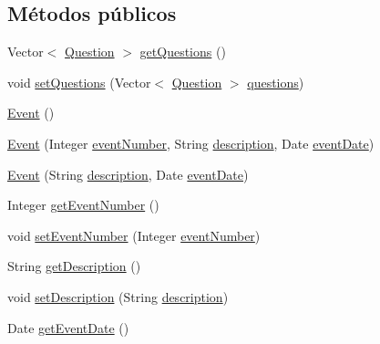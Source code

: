 \subsection*{Métodos públicos}
\begin{DoxyCompactItemize}
\item 
Vector$<$ \mbox{\hyperlink{classdomain_1_1Question}{Question}} $>$ \mbox{\hyperlink{classdomain_1_1Event_a00fc2897c3329b2319545e165e54b8da}{get\+Questions}} ()
\item 
void \mbox{\hyperlink{classdomain_1_1Event_ae1bcc6c5a8da547b4f930132fdfb7a36}{set\+Questions}} (Vector$<$ \mbox{\hyperlink{classdomain_1_1Question}{Question}} $>$ \mbox{\hyperlink{classdomain_1_1Event_ab5621abc5bae7bc3d8ece713fa2e1e38}{questions}})
\item 
\mbox{\hyperlink{classdomain_1_1Event_a1d0bc6f1fb6b0d7f7732ab132c09e868}{Event}} ()
\item 
\mbox{\hyperlink{classdomain_1_1Event_ae54063394d89364db7a777096e64d2e0}{Event}} (Integer \mbox{\hyperlink{classdomain_1_1Event_a7a297461605e871f55e9752c5652a07e}{event\+Number}}, String \mbox{\hyperlink{classdomain_1_1Event_a14d38176e81b4e75c84d4aaea994a306}{description}}, Date \mbox{\hyperlink{classdomain_1_1Event_a3cc1c6dde4868b8048cc2dc0626cd269}{event\+Date}})
\item 
\mbox{\hyperlink{classdomain_1_1Event_a42cb94d15d4097d61e63d501f3f846c6}{Event}} (String \mbox{\hyperlink{classdomain_1_1Event_a14d38176e81b4e75c84d4aaea994a306}{description}}, Date \mbox{\hyperlink{classdomain_1_1Event_a3cc1c6dde4868b8048cc2dc0626cd269}{event\+Date}})
\item 
Integer \mbox{\hyperlink{classdomain_1_1Event_a8b5055f21582c239b4e315e0c6050cb4}{get\+Event\+Number}} ()
\item 
void \mbox{\hyperlink{classdomain_1_1Event_ace19804912ce14a756e677a394c29fe5}{set\+Event\+Number}} (Integer \mbox{\hyperlink{classdomain_1_1Event_a7a297461605e871f55e9752c5652a07e}{event\+Number}})
\item 
String \mbox{\hyperlink{classdomain_1_1Event_a161f14b5bbd0140360b090d9f466ac57}{get\+Description}} ()
\item 
void \mbox{\hyperlink{classdomain_1_1Event_aa17b7e9162813a1010056c84e3fc8143}{set\+Description}} (String \mbox{\hyperlink{classdomain_1_1Event_a14d38176e81b4e75c84d4aaea994a306}{description}})
\item 
Date \mbox{\hyperlink{classdomain_1_1Event_ac0959d1f92fa9081b0a883c3d60e6dfa}{get\+Event\+Date}} ()
\item 

\end{DoxyCompactItemize}
